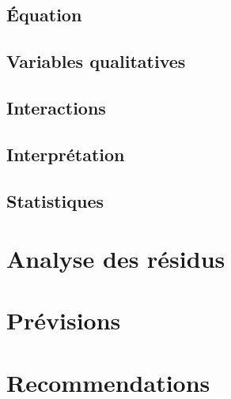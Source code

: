 \documentclass{article}\usepackage[]{graphicx}\usepackage[]{color}
\begin{document}
\subsection{Équation}
\label{ssec:equation}

\subsection{Variables qualitatives}
\label{ssec:var_qual}

\subsection{Interactions}
\label{ssec:interaction}

\subsection{Interprétation}
\label{ssec:interpretation}

\subsection{Statistiques}
\label{ssec:stats}

\section{Analyse des résidus}
\label{sec:analyse}

\section{Prévisions}
\label{sec:prev}

\section{Recommendations}
\end{document}
